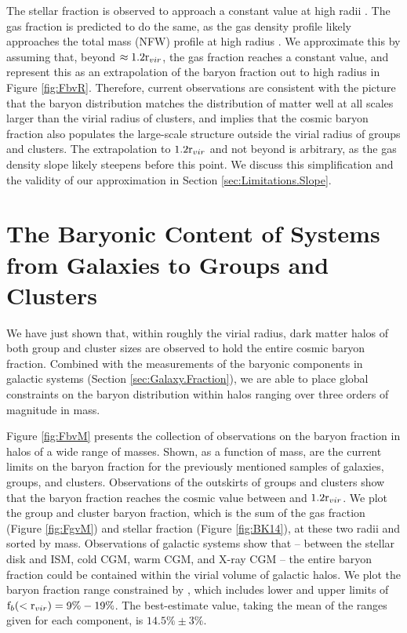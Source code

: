 The stellar fraction is observed to approach a constant value at high
radii \citep{Bahcall2014}. The gas fraction is predicted to do the
same, as the gas density profile likely approaches the total mass
(NFW) profile at high radius \citep[e.g.,][and
  refs.~therein]{Umetsu2009}.  We approximate this by assuming that,
beyond $\approx 1.2\textrm{r\ensuremath{_{vir}}}{}$, the gas fraction reaches a constant
value, and represent this as an extrapolation of the baryon fraction
out to high radius in Figure \ref{fig:FbvR}. Therefore, current
observations are consistent with the picture that the baryon
distribution matches the distribution of matter well at all scales
larger than the virial radius of clusters, and implies that the cosmic
baryon fraction also populates the large-scale structure outside the
virial radius of groups and clusters. The extrapolation to $1.2\textrm{r\ensuremath{_{vir}}}$
and not beyond is arbitrary, as the gas density slope likely steepens
before this point. We discuss this simplification and the validity of
our approximation in Section \ref{sec:Limitations.Slope}.

\section{The Baryonic Content of Systems from Galaxies to Groups and Clusters}
\label{sec:Baryonic}

We have just shown that, within roughly the virial radius, dark matter
halos of both group and cluster sizes are observed to hold the entire
cosmic baryon fraction. Combined with the measurements of the baryonic
components in galactic systems (Section \ref{sec:Galaxy.Fraction}), we
are able to place global constraints on the baryon distribution within
halos ranging over three orders of magnitude in mass.

Figure \ref{fig:FbvM} presents the collection of observations on the
baryon fraction in halos of a wide range of masses. Shown, as a
function of mass, are the current limits on the baryon fraction for
the previously mentioned samples of galaxies, groups, and
clusters. Observations of the outskirts of groups and clusters show
that the baryon fraction reaches the cosmic value between \rvir{} and
$1.2\textrm{r\ensuremath{_{vir}}}{}$. We plot the group and cluster baryon fraction, which is
the sum of the gas fraction (Figure \ref{fig:FgvM}) and stellar
fraction (Figure \ref{fig:BK14}), at these two radii and
sorted by mass. Observations of galactic systems show that -- between the
stellar disk and ISM, cold CGM, warm CGM, and X-ray CGM -- the entire
baryon fraction could be contained within the virial volume of galactic
halos. We plot the baryon fraction range constrained by
\citet{Werk2014}, which includes lower and upper limits of
$\textrm{f\ensuremath{_b}}(<\textrm{r\ensuremath{_{vir}}}) = 9\% - 19\%$. The best-estimate value, taking the mean
of the ranges given for each component, is $14.5\% \pm 3\%$.

